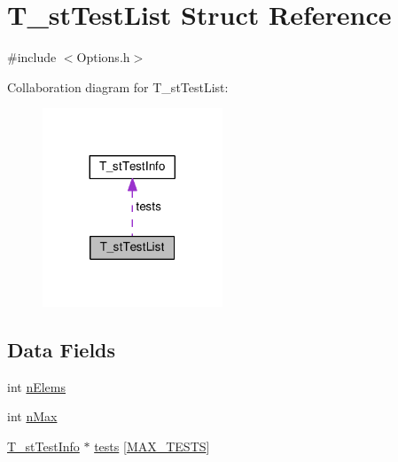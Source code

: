 \hypertarget{structT__stTestList}{\section{T\-\_\-st\-Test\-List Struct Reference}
\label{structT__stTestList}
}


{\ttfamily \#include $<$Options.\-h$>$}



Collaboration diagram for T\-\_\-st\-Test\-List\-:\nopagebreak
\begin{figure}[H]
\begin{center}
\leavevmode
\includegraphics[width=152pt]{structT__stTestList__coll__graph}
\end{center}
\end{figure}
\subsection*{Data Fields}
\begin{DoxyCompactItemize}
\item 
int \hyperlink{structT__stTestList_a3c0aa528e2fcb76dee4bfed8cc6af283}{n\-Elems}
\item 
int \hyperlink{structT__stTestList_a957fc1ce837a0da88887b9fd92aed436}{n\-Max}
\item 
\hyperlink{structT__stTestInfo}{T\-\_\-st\-Test\-Info} $\ast$ \hyperlink{structT__stTestList_a73e25f5a90fc3e8c56dc5bdfb3a94495}{tests} \mbox{[}\hyperlink{Options_8h_a2a77d2f2c5b698c69c19e1f8782bf709}{M\-A\-X\-\_\-\-T\-E\-S\-T\-S}\mbox{]}
\end{DoxyCompactItemize}


